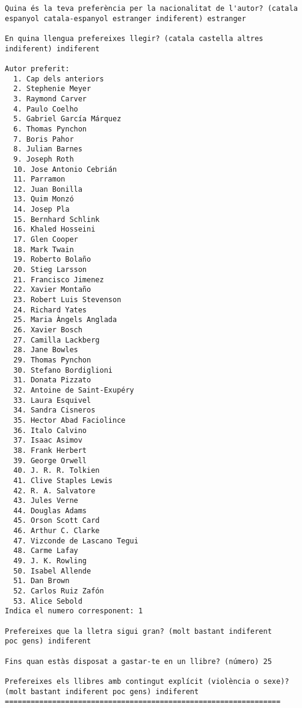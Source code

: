 \begin{verbatim}
Quina és la teva preferència per la nacionalitat de l'autor? (catala
espanyol catala-espanyol estranger indiferent) estranger

En quina llengua prefereixes llegir? (catala castella altres
indiferent) indiferent

Autor preferit: 
  1. Cap dels anteriors
  2. Stephenie Meyer
  3. Raymond Carver
  4. Paulo Coelho
  5. Gabriel García Márquez
  6. Thomas Pynchon
  7. Boris Pahor
  8. Julian Barnes
  9. Joseph Roth
  10. Jose Antonio Cebrián
  11. Parramon
  12. Juan Bonilla
  13. Quim Monzó
  14. Josep Pla
  15. Bernhard Schlink
  16. Khaled Hosseini
  17. Glen Cooper
  18. Mark Twain
  19. Roberto Bolaño
  20. Stieg Larsson
  21. Francisco Jimenez
  22. Xavier Montaño
  23. Robert Luis Stevenson
  24. Richard Yates
  25. Maria Àngels Anglada
  26. Xavier Bosch
  27. Camilla Lackberg
  28. Jane Bowles
  29. Thomas Pynchon
  30. Stefano Bordiglioni
  31. Donata Pizzato
  32. Antoine de Saint-Exupéry
  33. Laura Esquivel
  34. Sandra Cisneros
  35. Hector Abad Faciolince
  36. Italo Calvino
  37. Isaac Asimov
  38. Frank Herbert
  39. George Orwell
  40. J. R. R. Tolkien
  41. Clive Staples Lewis
  42. R. A. Salvatore
  43. Jules Verne
  44. Douglas Adams
  45. Orson Scott Card
  46. Arthur C. Clarke
  47. Vizconde de Lascano Tegui
  48. Carme Lafay
  49. J. K. Rowling
  50. Isabel Allende
  51. Dan Brown
  52. Carlos Ruiz Zafón
  53. Alice Sebold
Indica el numero corresponent: 1

Prefereixes que la lletra sigui gran? (molt bastant indiferent
poc gens) indiferent

Fins quan estàs disposat a gastar-te en un llibre? (número) 25

Prefereixes els llibres amb contingut explícit (violència o sexe)?
(molt bastant indiferent poc gens) indiferent
================================================================


\end{verbatim}
